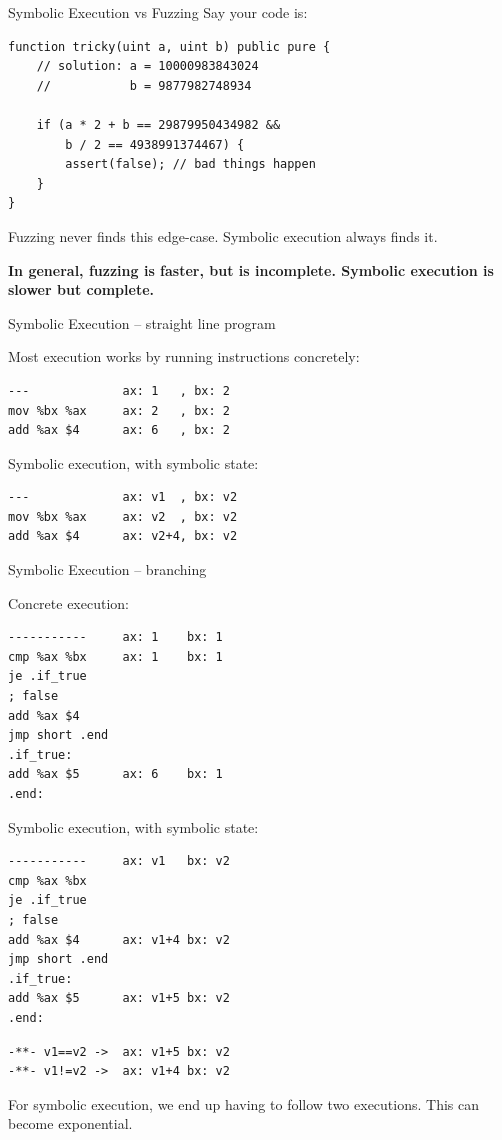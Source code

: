 \documentclass[aspectratio=169]{beamer}
\begin{document}
\begin{frame}[fragile=singleslide]{Symbolic Execution vs Fuzzing}
Say your code is:

\begin{Verbatim}[frame=single, framerule=0.2mm, framesep=2mm,fontsize=\small]
function tricky(uint a, uint b) public pure {
	// solution: a = 10000983843024
	//           b = 9877982748934
	
	if (a * 2 + b == 29879950434982 &&
	    b / 2 == 4938991374467) {
		assert(false); // bad things happen
	}
}
\end{Verbatim}

Fuzzing never finds this edge-case. Symbolic execution always finds it.
\bigskip 

\textbf{In general, fuzzing is faster, but is incomplete. Symbolic execution is slower but complete.}

\end{frame}



\begin{frame}[fragile=singleslide]{Symbolic Execution -- straight line program}

Most execution works by running instructions concretely:
\begin{verbatim}
---             ax: 1   , bx: 2
mov %bx %ax     ax: 2   , bx: 2
add %ax $4      ax: 6   , bx: 2
\end{verbatim}
\bigskip

Symbolic execution, with symbolic state:
\begin{verbatim}
---             ax: v1  , bx: v2
mov %bx %ax     ax: v2  , bx: v2
add %ax $4      ax: v2+4, bx: v2
\end{verbatim}
\end{frame}

\begin{frame}[fragile=singleslide]{Symbolic Execution -- branching}
\begin{minipage}[t]{0.45\textwidth}
Concrete execution:
\begin{Verbatim}[fontsize=\small]
-----------     ax: 1    bx: 1
cmp %ax %bx     ax: 1    bx: 1
je .if_true     
; false
add %ax $4
jmp short .end
.if_true:
add %ax $5      ax: 6    bx: 1
.end:
\end{Verbatim}
\end{minipage}%
\begin{minipage}[t]{0.45\textwidth}
Symbolic execution, with symbolic state:
\begin{Verbatim}[fontsize=\small]
-----------     ax: v1   bx: v2
cmp %ax %bx     
je .if_true     
; false
add %ax $4      ax: v1+4 bx: v2
jmp short .end
.if_true:
add %ax $5      ax: v1+5 bx: v2
.end:
\end{Verbatim}
\begin{Verbatim}[fontsize=\small]
-**- v1==v2 ->  ax: v1+5 bx: v2
-**- v1!=v2 ->  ax: v1+4 bx: v2
\end{Verbatim}
\end{minipage}
\bigskip

For symbolic execution, we end up having to follow two executions. This can become exponential.
\end{frame}
\end{document}
